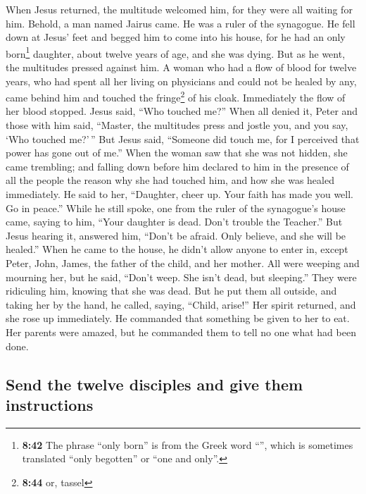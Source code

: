  When Jesus returned, the multitude welcomed him, for
they were all waiting for him.  Behold, a man named
Jairus came. He was a ruler of the synagogue. He fell down at Jesus'
feet and begged him to come into his house,  for he had
an only born\footnote{\textbf{8:42} The phrase ``only born'' is from the
  Greek word ``'', which is sometimes translated ``only
  begotten'' or ``one and only''.} daughter, about twelve years of age,
and she was dying. But as he went, the multitudes pressed against him.
 A woman who had a flow of blood for twelve years, who
had spent all her living on physicians and could not be healed by any,
 came behind him and touched the fringe\footnote{\textbf{8:44}
  or, tassel} of his cloak. Immediately the flow of her blood stopped.
 Jesus said, ``Who touched me?'' When all denied it,
Peter and those with him said, ``Master, the multitudes press and jostle
you, and you say, `Who touched me?'\,''  But Jesus said,
``Someone did touch me, for I perceived that power has gone out of me.''
 When the woman saw that she was not hidden, she came
trembling; and falling down before him declared to him in the presence
of all the people the reason why she had touched him, and how she was
healed immediately.  He said to her, ``Daughter, cheer
up. Your faith has made you well. Go in peace.''  While
he still spoke, one from the ruler of the synagogue's house came, saying
to him, ``Your daughter is dead. Don't trouble the Teacher.''
 But Jesus hearing it, answered him, ``Don't be afraid.
Only believe, and she will be healed.''  When he came to
the house, he didn't allow anyone to enter in, except Peter, John,
James, the father of the child, and her mother.  All were
weeping and mourning her, but he said, ``Don't weep. She isn't dead, but
sleeping.''  They were ridiculing him, knowing that she
was dead.  But he put them all outside, and taking her by
the hand, he called, saying, ``Child, arise!''  Her
spirit returned, and she rose up immediately. He commanded that
something be given to her to eat.  Her parents were
amazed, but he commanded them to tell no one what had been done.

\hypertarget{send-the-twelve-disciples-and-give-them-instructions}{%
\subsection{Send the twelve disciples and give them
instructions}\label{send-the-twelve-disciples-and-give-them-instructions}}

